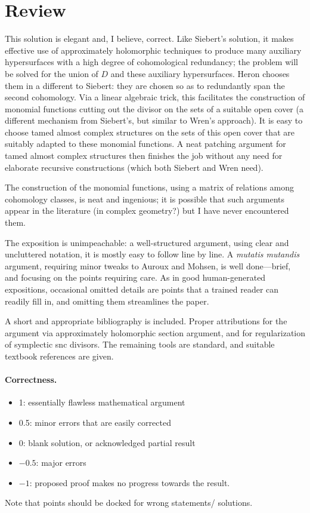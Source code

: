 \documentclass[11pt]{article}
\theoremstyle{definition}
\theoremstyle{remark}
\begin{document}
\maketitle

\section{Review}

This solution is elegant and, I believe, correct. Like Siebert's solution, it makes effective use of approximately holomorphic techniques to produce many auxiliary hypersurfaces with a high degree of cohomological redundancy; the problem will be solved for the union of $D$ and these auxiliary hypersurfaces. Heron chooses them in a different to Siebert: they are chosen so as to redundantly span the second cohomology. Via a linear algebraic trick, this facilitates the construction of monomial functions cutting out the divisor on the sets of a suitable open cover (a different mechanism from Siebert's, but similar to Wren's approach). It is easy to choose tamed almost complex structures on the sets of this open cover that are suitably adapted to these monomial functions. A neat patching argument for tamed almost complex structures then finishes the job without any need for elaborate recursive constructions (which both Siebert and Wren need).

The construction of the monomial functions, using a matrix of relations among cohomology classes, is neat and ingenious; it is possible that such arguments appear in the literature (in complex geometry?) but I have never encountered them.

The exposition is unimpeachable: a well-structured argument, using clear and uncluttered notation, it is mostly easy to follow line by line. A \emph{mutatis mutandis} argument, requiring minor tweaks to Auroux and Mohsen, is well done---brief, and focusing on the points requiring care. As in good human-generated expositions, occasional omitted details are points that a trained reader can readily fill in, and omitting them streamlines the paper.

A short and appropriate bibliography is included.  Proper attributions for the argument via approximately holomorphic section argument, and for regularization of symplectic snc divisors. The remaining tools are standard, and suitable textbook references are given.


\paragraph{Correctness.}
\begin{itemize}
	\item  1: essentially flawless mathematical argument
	\item  0.5: minor errors that are easily corrected
	\item  0: blank solution, or acknowledged partial result
	\item  $-0.5$: major errors
	\item  $-1$: proposed proof makes no progress towards the result.
\end{itemize}
Note that points should be docked for wrong statements/ solutions.
\end{document}
